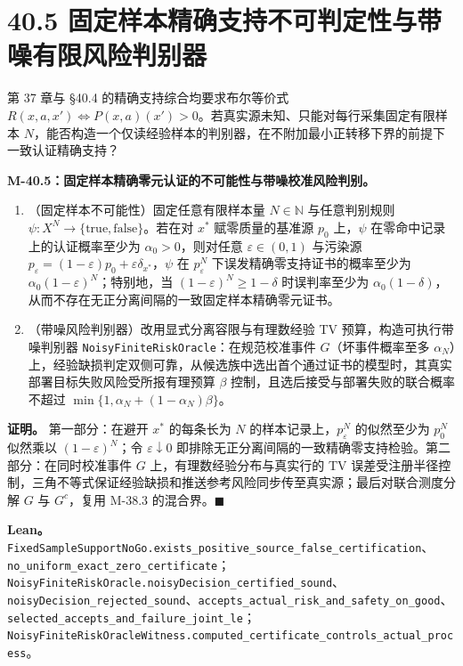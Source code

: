 \documentclass[
  11pt,
  oneside]{book}
\providecommand{\tightlist}{%
  \setlength{\itemsep}{0pt}\setlength{\parskip}{0pt}}
\begin{document}
\section{40.5 固定样本精确支持不可判定性与带噪有限风险判别器}\label{ux56faux5b9aux6837ux672cux7cbeux786eux652fux6301ux4e0dux53efux5224ux5b9aux6027ux4e0eux5e26ux566aux6709ux9650ux98ceux9669ux5224ux522bux5668}

第 37 章与 §40.4 的精确支持综合均要求布尔等价式 \(R(x,a,x')\iff P(x,a)(x')>0\)。若真实源未知、只能对每行采集固定有限样本 \(N\)，能否构造一个仅读经验样本的判别器，在不附加最小正转移下界的前提下一致认证精确支持？

\hypertarget{m-40-5}{}\label{m-40-5}

\textbf{M-40.5：固定样本精确零元认证的不可能性与带噪校准风险判别。}

\begin{enumerate}
\def\labelenumi{\arabic{enumi}.}
\tightlist
\item
  （固定样本不可能性）固定任意有限样本量 \(N\in\mathbb N\) 与任意判别规则 \(\psi:X^N\to\{\mathrm{true},\mathrm{false}\}\)。若在对 \(x^*\) 赋零质量的基准源 \(p_0\) 上，\(\psi\) 在零命中记录上的认证概率至少为 \(\alpha_0>0\)，则对任意 \(\varepsilon\in(0,1)\) 与污染源 \(p_\varepsilon=(1-\varepsilon)p_0+\varepsilon\delta_{x^*}\)，\(\psi\) 在 \(p_\varepsilon^N\) 下误发精确零支持证书的概率至少为 \(\alpha_0(1-\varepsilon)^N\)；特别地，当 \((1-\varepsilon)^N\ge 1-\delta\) 时误判率至少为 \(\alpha_0(1-\delta)\)，从而不存在无正分离间隔的一致固定样本精确零元证书。
\item
  （带噪风险判别器）改用显式分离容限与有理数经验 TV 预算，构造可执行带噪判别器 \nolinkurl{NoisyFiniteRiskOracle}：在规范校准事件 \(G\)（坏事件概率至多 \(\alpha_N\)）上，经验缺损判定双侧可靠，从候选族中选出首个通过证书的模型时，其真实部署目标失败风险受所报有理预算 \(\beta\) 控制，且选后接受与部署失败的联合概率不超过 \(\min\{1,\alpha_N+(1-\alpha_N)\beta\}\)。
\end{enumerate}

\textbf{证明。} 第一部分：在避开 \(x^*\) 的每条长为 \(N\) 的样本记录上，\(p_\varepsilon^N\) 的似然至少为 \(p_0^N\) 似然乘以 \((1-\varepsilon)^N\)；令 \(\varepsilon\downarrow0\) 即排除无正分离间隔的一致精确零支持检验。第二部分：在同时校准事件 \(G\) 上，有理数经验分布与真实行的 TV 误差受注册半径控制，三角不等式保证经验缺损和推送参考风险同步传至真实源；最后对联合测度分解 \(G\) 与 \(G^c\)，复用 M-38.3 的混合界。\(\blacksquare\)

\textbf{Lean。} \nolinkurl{FixedSampleSupportNoGo.exists_positive_source_false_certification}、\nolinkurl{no_uniform_exact_zero_certificate}；\nolinkurl{NoisyFiniteRiskOracle.noisyDecision_certified_sound}、\nolinkurl{noisyDecision_rejected_sound}、\nolinkurl{accepts_actual_risk_and_safety_on_good}、\nolinkurl{selected_accepts_and_failure_joint_le}；\nolinkurl{NoisyFiniteRiskOracleWitness.computed_certificate_controls_actual_process}。
\end{document}
